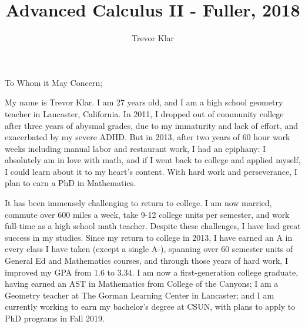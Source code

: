 \documentclass[letterpaper, 12pt]{article}
\title{Advanced Calculus II - Fuller, 2018}
\author{Trevor Klar}
\theoremstyle{definition}%
\numberwithin{exercise}{section}
\theoremstyle{remark}%
\begin{document}




To Whom it May Concern;

\mbox{}

My name is Trevor Klar. I am 27 years old, and I am a high school geometry teacher in Lancaster, California. In 2011, I dropped out of community college after three years of abysmal grades, due to my immaturity and lack of effort, and exacerbated by my severe ADHD. But in 2013, after two years of 60 hour work weeks including manual labor and restaurant work, I had an epiphany: I absolutely am in love with math, and if I went back to college and applied myself, I could learn about it to my heart's content. With hard work and perseverance, I plan to earn a PhD in Mathematics. 

It has been immensely challenging to return to college. I am now married, commute over 600 miles a week, take 9-12 college units per semester, and work full-time as a high school math teacher. Despite these challenges, I have had great success in my studies. Since my return to college in 2013, I have earned an A in every class I have taken (except a single A-), spanning over 60 semester units of General Ed and Mathematics courses, and through those years of hard work, I improved my GPA from 1.6 to 3.34. I am now a first-generation college graduate, having earned an AST in Mathematics from College of the Canyons; I am a Geometry teacher at The Gorman Learning Center in Lancaster; and I am currently working to earn my bachelor's degree at CSUN, with plans to apply to PhD programs in Fall 2019. 
\end{document}
